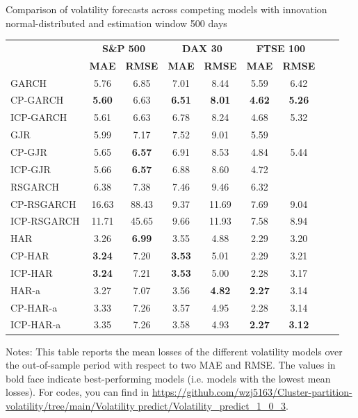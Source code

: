 \documentclass[preprint,12pt,authoryear]{elsarticle}
\begin{document}
\begin{center}
\begin{threeparttable}
\centering \footnotesize
\caption{\footnotesize Comparison of volatility forecasts across competing models with innovation normal-distributed and estimation window 500 days}\label{tab35}
\begin{tabular}{l c c c c c c c c}
\toprule
 & \multicolumn{2}{c}{\textbf{S\&P 500}} & \multicolumn{2}{c}{\textbf{DAX 30}} & \multicolumn{2}{c}{\textbf{FTSE 100}} \\
\cmidrule(r){2-3} \cmidrule(r){4-5} \cmidrule(r){6-7}
 & \textbf{MAE} & \textbf{RMSE} & \textbf{MAE} & \textbf{RMSE} & \textbf{MAE} & \textbf{RMSE} \\
\cmidrule{2-7}
GARCH        &  5.76         & 6.85   & 7.01          & 8.44          & 5.59  & 6.42  \\
CP-GARCH     & \textbf{5.60} & 6.63   & \textbf{6.51} & \textbf{8.01} & \textbf{4.62} &  \textbf{5.26} \\
ICP-GARCH    & 5.61          & 6.63   & 6.78          & 8.24          &   4.68  &  5.32  \\
GJR          &  5.99         & 7.17   & 7.52          & 9.01          & 5.59  &\;6.31  \\
CP-GJR       &  5.65  & \textbf{6.57} & 6.91          & 8.53          & 4.84 & 5.44 \\
ICP-GJR      &  5.66  & \textbf{6.57} & 6.88          & 8.60          & 4.72  & \;5.34  \\
RSGARCH      &  6.38         & 7.38   & 7.46          & 9.46          & 6.32  & \;7.41  \\
CP-RSGARCH   & 16.63         & 88.43  & 9.37          & 11.69         & 7.69  &  9.04  \\
ICP-RSGARCH  & 11.71         & 45.65  & 9.66          & 11.93         & 7.58  &  8.94  \\
\midrule
HAR          & 3.26 & \textbf{6.99} & 3.55          & 4.88 & 2.29          & 3.20 \\
CP-HAR       & \textbf{3.24} & 7.20 & \textbf{3.53} & 5.01 & 2.29          & 3.21 \\
ICP-HAR      & \textbf{3.24} & 7.21 & \textbf{3.53} & 5.00 & 2.28          & 3.17 \\
HAR-a        & 3.27          & 7.07 & 3.56 & \textbf{4.82} & \textbf{2.27} & 3.14 \\
CP-HAR-a     & 3.33          & 7.26 & 3.57          & 4.95 & 2.28          & 3.14 \\
ICP-HAR-a    & 3.35          & 7.26 & 3.58          & 4.93 & \textbf{2.27} & \textbf{3.12} \\
\bottomrule
\end{tabular}
Notes: This table reports the mean losses of the different volatility models over the out-of-sample period with respect to two MAE and RMSE. The values in bold face indicate best-performing models (i.e. models with the lowest mean losses). For codes, you can find in
\url{https://github.com/wzj5163/Cluster-partition-volatility/tree/main/Volatility predict/Volatility_predict_1_0_3}.
\end{threeparttable}
\end{center}
\end{document}
